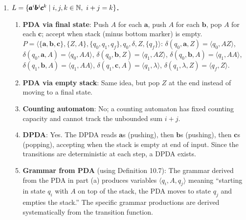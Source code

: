 \begin{enumerate}[{10.}1. ]
\begin{enumerate}
\item From (a), processing $\pmb{a}^n$ from start symbol $S$ results in stack $C^n$ (taking the path that never re-expands $S$, i.e., always choosing $\delta(t,\pmb{a},S)=\langle t,C\rangle$ after the first step, or more precisely: $SC^n$ or $C^n$). For the machine to accept via final state (returning to state $t$ with empty input), the stack must be emptied. From (b), $C^n$ is emptied by reading exactly $\pmb{b}^n$. Thus:
\[
L(P'_2) = \{\pmb{a}^n\pmb{b}^n \mid n\geq 1\}.
\]
For $n=0$: the initial configuration $\langle t,\lambda,S\rangle$ has $S$ still on the stack, so the empty-stack acceptance condition fails and $\lambda\notin L(P'_2)$. Hence $L(P'_2) = \{\pmb{a}^n\pmb{b}^n \mid n\geq 1\}$.
\end{enumerate}

\item \textbf{$L=\{\pmb{a}^i\pmb{b}^j\pmb{c}^k \mid i,j,k\in\NN,\ i+j=k\}$.}

\begin{enumerate}
\item \textbf{PDA via final state}: Push $A$ for each $\pmb{a}$, push $A$ for each $\pmb{b}$, pop $A$ for each $\pmb{c}$; accept when stack (minus bottom marker) is empty.
$P = \langle\{\pmb{a},\pmb{b},\pmb{c}\},\{Z,A\},\{q_0,q_1,q_f\},q_0,\delta,Z,\{q_f\}\rangle$:
$\delta(q_0,\pmb{a},Z)=\langle q_0,AZ\rangle$, $\delta(q_0,\pmb{a},A)=\langle q_0,AA\rangle$, $\delta(q_0,\pmb{b},Z)=\langle q_1,AZ\rangle$, $\delta(q_0,\pmb{b},A)=\langle q_1,AA\rangle$, $\delta(q_1,\pmb{b},A)=\langle q_1,AA\rangle$, $\delta(q_1,\pmb{c},A)=\langle q_1,\lambda\rangle$, $\delta(q_1,\lambda,Z)=\langle q_f,Z\rangle$.

\item \textbf{PDA via empty stack}: Same idea, but pop $Z$ at the end instead of moving to a final state.

\item \textbf{Counting automaton}: No; a counting automaton has fixed counting capacity and cannot track the unbounded sum $i+j$.

\item \textbf{DPDA}: Yes. The DPDA reads $\pmb{a}$s (pushing), then $\pmb{b}$s (pushing), then $\pmb{c}$s (popping), accepting when the stack is empty at end of input. Since the transitions are deterministic at each step, a DPDA exists.

\item \textbf{Grammar from PDA} (using Definition 10.7): The grammar derived from the PDA in part (a) produces variables $\langle q_i, A, q_j\rangle$ meaning ``starting in state $q_i$ with $A$ on top of the stack, the PDA moves to state $q_j$ and empties the stack.'' The specific grammar productions are derived systematically from the transition function.
\end{enumerate}


\end{enumerate}
